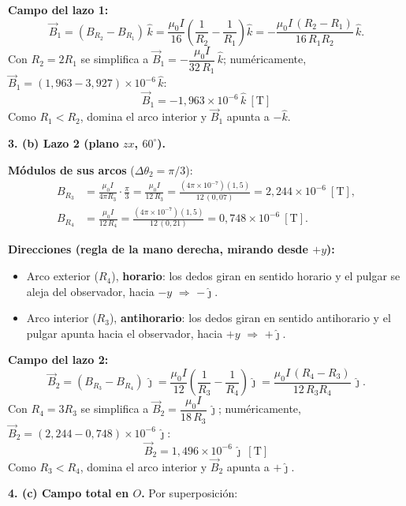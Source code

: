 \documentclass[12pt,letterpaper]{article}
\newcommand{\secgap}{\vspace{0.6cm}}
\newcommand{\jj}{\hat{\jmath}}
\newcommand{\kk}{\hat{k}}
\begin{document}
\noindent\textbf{Campo del lazo 1:}
\[
    \vec{B}_1 = (B_{R_2}-B_{R_1})\,\kk
    = \frac{\mu_0 I}{16}\left(\frac{1}{R_2}-\frac{1}{R_1}\right)\kk
    = -\frac{\mu_0 I\,(R_2-R_1)}{16\,R_1R_2}\,\kk .
\]
Con $R_2 = 2R_1$ se simplifica a $\vec{B}_1 = -\dfrac{\mu_0 I}{32\,R_1}\,\kk$; num\'ericamente,
$\vec{B}_1 = (1{,}963-3{,}927)\times10^{-6}\,\kk$:
\[
    \boxed{\vec{B}_1 = -1{,}963\times10^{-6}\,\kk\ [\text{T}]}
\]
Como $R_1<R_2$, domina el arco interior y $\vec{B}_1$ apunta a $-\kk$.

\secgap

\noindent\textbf{3. (b) Lazo 2 (plano $zx$, $60^\circ$).}

\noindent\textbf{M\'odulos de sus arcos} ($\Delta\theta_2 = \pi/3$):
\begin{align*}
    B_{R_3} &= \frac{\mu_0 I}{4\pi R_3}\cdot\frac{\pi}{3} = \frac{\mu_0 I}{12\,R_3}
             = \frac{(4\pi\times10^{-7})(1{,}5)}{12\,(0{,}07)} = 2{,}244\times10^{-6}\ [\text{T}],\\
    B_{R_4} &= \frac{\mu_0 I}{12\,R_4}
             = \frac{(4\pi\times10^{-7})(1{,}5)}{12\,(0{,}21)} = 0{,}748\times10^{-6}\ [\text{T}].
\end{align*}

\noindent\textbf{Direcciones (regla de la mano derecha, mirando desde $+y$):}
\begin{itemize}\setlength\itemsep{2pt}
    \item Arco exterior ($R_4$), \textbf{horario}: los dedos giran en sentido horario y el pulgar se
          aleja del observador, hacia $-y$ $\Rightarrow$ $-\jj$.
    \item Arco interior ($R_3$), \textbf{antihorario}: los dedos giran en sentido antihorario y el
          pulgar apunta hacia el observador, hacia $+y$ $\Rightarrow$ $+\jj$.
\end{itemize}

\noindent\textbf{Campo del lazo 2:}
\[
    \vec{B}_2 = (B_{R_3}-B_{R_4})\,\jj
    = \frac{\mu_0 I}{12}\left(\frac{1}{R_3}-\frac{1}{R_4}\right)\jj
    = \frac{\mu_0 I\,(R_4-R_3)}{12\,R_3R_4}\,\jj .
\]
Con $R_4 = 3R_3$ se simplifica a $\vec{B}_2 = \dfrac{\mu_0 I}{18\,R_3}\,\jj$; num\'ericamente,
$\vec{B}_2 = (2{,}244-0{,}748)\times10^{-6}\,\jj$:
\[
    \boxed{\vec{B}_2 = 1{,}496\times10^{-6}\,\jj\ [\text{T}]}
\]
Como $R_3<R_4$, domina el arco interior y $\vec{B}_2$ apunta a $+\jj$.

\newpage
\noindent\textbf{4. (c) Campo total en $O$.} Por superposici\'on:
\end{document}
